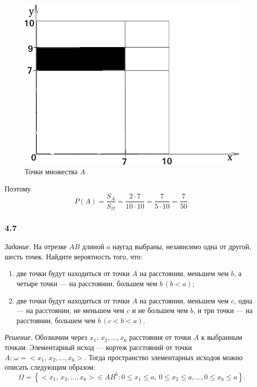 \begin{figure}[h!]
  \centering
  \includegraphics[width=.4\textwidth]{./pictures/4_6.png}
  \caption{Точки множества $A$}
  \label{fig:46}
\end{figure}

Поэтому
$$P \left( A \right) =
\frac{S_A}{S_{ \Omega }} =
\frac{2 \cdot 7}{10 \cdot 10} =
\frac{7}{5 \cdot 10} =
\frac{7}{50}.$$

\subsubsection*{4.7}

\textit{Задание.} На отрезке $AB$ длиной $a$ наугад выбраны, независимо одна от другой, шесть точек.
Найдите вероятность того, что:
\begin{enumerate}[label=\alph*)]
\item две точки будут находиться от точки $A$ на расстоянии, меньшем чем $b$, а четыре точки --- на расстоянии, большем чем $b \, \left(b<a \right) $;
\item две точки будут находиться от точки $A$ на расстоянии, меньшем чем $c$, одна --- на расстоянии, не меньшем чем $c$ и не большем чем $b$,
и три точки --- на расстоянии, большем чем $b \, \left( c<b<a \right) $.
\end{enumerate}

\textit{Решение.} Обозначим через $x_1, \, x_2, \dotsc, x_6$ расстояния от точки $A$ к выбранным точкам.
Элементарный исход ---  кортеж расстояний от точки $A: \, \omega = <x_1, \, x_2, \dotsc, x_6>$.
Тогда пространство элементарных исходов можно описать следующим образом:
$$ \Omega =
\left\{ <x_1, \, x_2, \dotsc, x_6> \in AB^6:
0 \leq x_1 \leq a, \,
0 \leq x_2 \leq a, \dotsc,
0 \leq x_6 \leq a \right\}.$$

